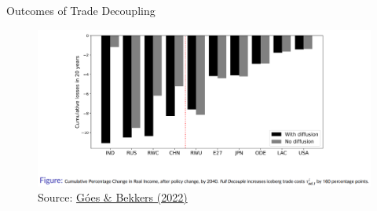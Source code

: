\documentclass[notes,11pt, aspectratio=169, xcolor=table]{beamer}
\begin{document}
\begin{frame}{Outcomes of Trade Decoupling}

\begin{figure}
    \centering
    \includegraphics[width=\linewidth]{figs/decoupling-result.png} \\
    Source: \href{https://www.wto.org/english/res_e/reser_e/ersd202209_e.pdf}{Góes \& Bekkers (2022)}
\end{figure}

\end{frame}
\end{document}
